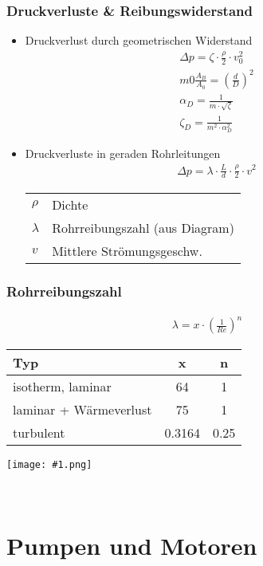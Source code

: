\documentclass[landscape,a4paper,10pt]{article}
\newcommand{\graphiccol}[1]{
\noindent
\begin{minipage}{\columnwidth}
\centering
\texttt{[image: \#1.png]}
\end{minipage}
\medskip \\
}
\begin{document}
\begin{multicols*}{3}
\subsubsection{Druckverluste \& Reibungswiderstand}
\begin{itemize}
\item Druckverlust durch geometrischen Widerstand
\begin{align*}
\Delta p = \zeta \cdot \frac{\rho}{2} \cdot v_0^2 \tag{Druckverlust}\\
m 0 \frac{A_B}{A_0} = \left( \frac{d}{D} \right)^2 \tag{Blenden Öffnungsverhältnis} \\
\alpha_D = \frac{1}{m \cdot \sqrt{\zeta}} \tag{Blendenbeiwert} \\
\zeta_D = \frac{1}{m^2 \cdot \alpha_D^2} \tag{Widerstandszahl}
\end{align*}
\item Druckverluste in geraden Rohrleitungen
\begin{align*}
\Delta p = \lambda \cdot \frac{L}{d} \cdot \frac{\rho}{2} \cdot v^2
\end{align*}
\begin{tabular}{ll}
$\rho$ & Dichte \\
$\lambda$ & Rohrreibungszahl (aus Diagram)\\
$v$ & Mittlere Strömungsgeschw.
\end{tabular}
\end{itemize}


\subsubsection{Rohrreibungszahl}
\begin{align*}
\lambda = x \cdot \left( \frac{1}{Re} \right)^n
\end{align*}

\begin{tabular}{lcc}
Typ & x & n \\
\hline 
isotherm, laminar & 64 & 1 \\
laminar + Wärmeverlust & 75 & 1 \\
turbulent & 0.3164 & 0.25
\end{tabular}


\graphiccol{Rohrreibungszahl}



\section{Pumpen und Motoren}

\end{multicols*}
\end{document}
